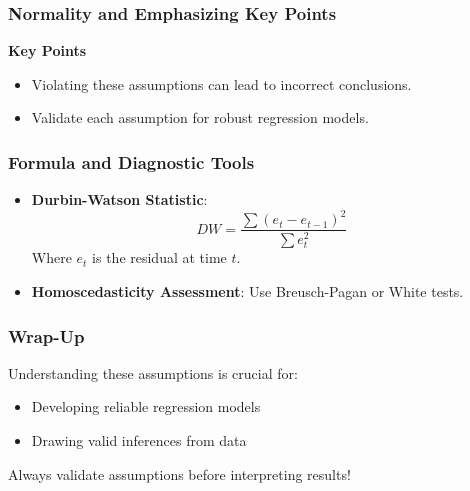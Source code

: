 \documentclass{beamer}
\begin{document}
\begin{frame}[fragile]
    \frametitle{Normality and Emphasizing Key Points}
    
        
        \item \textbf{Key Points}
        \begin{itemize}
            \item Violating these assumptions can lead to incorrect conclusions.
            \item Validate each assumption for robust regression models.
        \end{itemize}
\end{frame}

\begin{frame}[fragile]
    \frametitle{Formula and Diagnostic Tools}
    
    \begin{itemize}
        \item \textbf{Durbin-Watson Statistic}:
        \begin{equation}
            DW = \frac{\sum (e_t - e_{t-1})^2}{\sum e_t^2}
        \end{equation}
        Where \( e_t \) is the residual at time \( t \).
        
        \item \textbf{Homoscedasticity Assessment}: Use Breusch-Pagan or White tests.
        
    \end{itemize}
\end{frame}

\begin{frame}[fragile]
    \frametitle{Wrap-Up}
    
    Understanding these assumptions is crucial for:
    \begin{itemize}
        \item Developing reliable regression models
        \item Drawing valid inferences from data
    \end{itemize}
    Always validate assumptions before interpreting results!
\end{frame}
\end{document}
